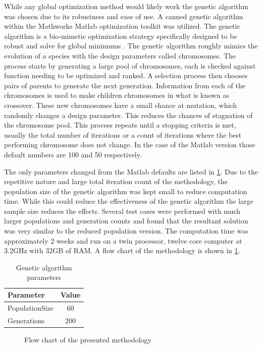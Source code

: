 \documentclass[preprint,12pt]{elsarticle}
\begin{document}
While any global optimization method would likely work the genetic algorithm was chosen due to its robustness and ease of use.  A canned genetic algorithm within the Mathworks Matlab\cite{matlabsoftware} optimization toolkit was utilized.  The genetic algorithm is a bio-mimetic optimization strategy specifically designed to be robust and solve for global minimums \cite{onwubiko}.  The genetic algorithm roughly mimics the evolution of a species with the design parameters called chromosomes.  The process starts by generating a large pool of chromosomes, each is checked against function needing to be optimized and ranked.  A selection process then chooses pairs of parents to generate the next generation.  Information from each of the chromosomes is used to make children chromosomes in what is known as crossover.  These new chromosomes have a small chance at mutation, which randomly changes a design parameter.  This reduces the chances of stagnation of the chromosome pool.  This process repeats until a stopping criteria is met, usually the total number of iterations or a count of iterations where the best performing chromosome does not change.  In the case of the Matlab version those default numbers are 100 and 50 respectively.

The only parameters changed from the Matlab defaults are listed in \cref{tab:gaparam}.  Due to the repetitive nature and large total iteration count of the methodology, the population size of the genetic algorithm was kept small to reduce computation time.  While this could reduce the effectiveness of the genetic algorithm the large sample size reduces the effects.  Several test cases were performed with much larger populations and generation counts and found that the resultant solution was very similar to the reduced population version.  The computation time was approximately 2 weeks and run on a twin processor, twelve core computer at 3.2GHz with 32GB of RAM.
A flow chart of the methodology is shown in \cref{fig:optflowchart}.
%
\begin{table}[!h!t!b!p]
\begin{center}
\begin{tabular}{ l c}
\hline
Parameter & Value \\ \hline
PopulationSize & 60 \\
Generations & 200 \\ \hline
 \end{tabular}
 \end{center}
\caption{Genetic algorithm parameters}
\label{tab:gaparam}
\end{table}
%
%
\begin{figure}[!tbp]
\centering

\caption{Flow chart of the presented methodology}
\label{fig:optflowchart}
\end{figure}
\end{document}
